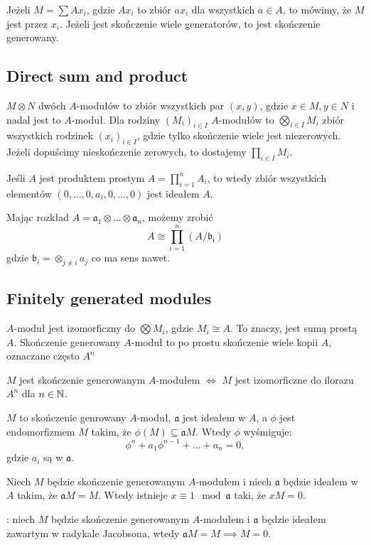 \documentclass[twocolumn]{article}
\begin{document}
Jeżeli $M=\sum Ax_i$, gdzie $Ax_i$ to zbiór $ax_i$ dla wszystkich $a\in A$, to mówimy, że $M$ jest  przez $x_i$. Jeżeli jest skończenie wiele generatorów, to jest skończenie generowany.

\subsection{Direct sum and product}

 $M\otimes N$ dwóch $A$-modułów to zbiór wszystkich par $(x, y)$, gdzie $x\in M,y\in N$ i nadal jest to $A$-moduł. Dla rodziny $(M_i)_{i\in I}$ $A$-modułów to $\bigotimes_{i\in I}M_i$ zbiór wszystkich rodzinek $(x_i)_{i\in I}$, gdzie tylko skończenie wiele jest niezerowych. Jeżeli dopuścimy nieskończenie zerowych, to dostajemy  $\prod_{i\in I}M_i$.

Jeśli $A$ jest produktem prostym $A=\prod_{i=1}^nA_i$, to wtedy zbiór wszystkich elementów $(0,...,0,a_i,0,...,0)$ jest ideałem $A$.

Mając rozkład $A=\mathfrak{a}_1\otimes...\otimes \mathfrak{a}_n$, możemy zrobić
$$A\cong\prod_{i=1}^n(A/\mathfrak{b_i})$$
gdzie $\mathfrak{b}_i=\otimes_{j\neq i} a_j$ co ma sens nawet.

\subsection{Finitely generated modules}

 $A$-moduł jest izomorficzny do $\bigotimes M_i$, gdzie $M_i\cong A$. To znaczy, jest sumą prostą $A$. Skończenie generowany $A$-moduł to po prostu skończenie wiele kopii $A$, oznaczane często $A^n$

$M$ jest skończenie generowanym $A$-modułem $\iff$ $M$ jest izomorficzne do ilorazu $A^n$ dla $n\in\mathbb{N}$.

$M$ to skończenie genrowany $A$-moduł, $\mathfrak{a}$ jest ideałem w $A$, a $\phi$ jest endomorfizmem $M$ takim, że $\phi(M)\subseteq\mathfrak{a}M$. Wtedy $\phi$ wyśmiguje:
$$\phi^n+a_1\phi^{n-1}+...+a_n=0,$$
gdzie $a_i$ są w $\mathfrak{a}$.

Niech $M$ będzie skończenie generowanym $A$-modułem i niech $\mathfrak{a}$ będzie ideałem w $A$ takim, że $\mathfrak{a}M=M$. Wtedy istnieje $x\equiv 1\mod\mathfrak{a}$ taki, że $xM=0$.

: niech $M$ będzie skończenie generowanym $A$-modułem i $\mathfrak{a}$ będzie ideałem zawartym w radykale Jacobsona, wtedy $\mathfrak{a}M=M\implies M=0$.
\end{document}
